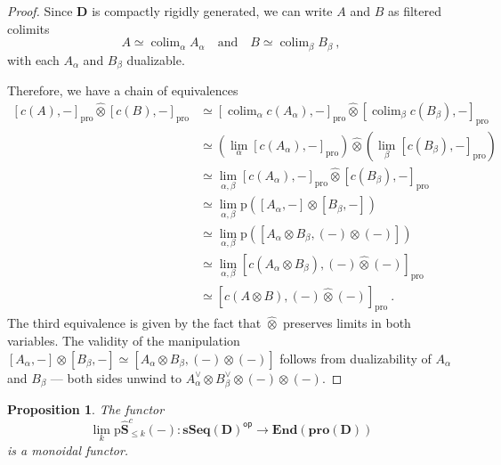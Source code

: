 \documentclass{proc-l}
\DeclareMathOperator*{\colim}{colim}
\theoremstyle{plain}
\newtheorem{proposition}[{theorem}]{Proposition}
\theoremstyle{definition}
\theoremstyle{remark}
\begin{document}
\begin{proof}
Since $\mathbf{D}$ is compactly rigidly generated, we can write $A$ and $B$ as filtered colimits
\[
A \simeq \colim_{\alpha} A_\alpha \quad \text{and} \quad B \simeq \colim_{\beta} B_\beta~,
\]
with each $A_\alpha$ and $B_\beta$ dualizable.

Therefore, we have a chain of equivalences
\begin{align*}
\left[c(A),-\right]_{\mathrm{pro}} \widehat{\otimes} \left[c(B),-\right]_{\mathrm{pro}} &\simeq \left[\colim_{\alpha} c(A_\alpha),-\right]_{\mathrm{pro}} \widehat{\otimes} \left[\colim_{\beta} c(B_\beta),-\right]_{\mathrm{pro}} \\
&\simeq \left(\lim_{\alpha} \left[c(A_\alpha),-\right]_{\mathrm{pro}}\right) \widehat{\otimes} \left( \lim_{\beta}\left[c(B_\beta),-\right]_{\mathrm{pro}}\right) \\
&\simeq \lim_{\alpha,\beta} \left[c(A_\alpha),-\right]_{\mathrm{pro}} \widehat{\otimes} \left[ c(B_\beta),-\right]_{\mathrm{pro}} \\
&\simeq \lim_{\alpha,\beta} \mathrm{p}\left(\left[A_\alpha,-\right] \otimes \left[ B_\beta,-\right]\right)\\
&\simeq \lim_{\alpha,\beta} \mathrm{p}\left(\left[A_\alpha \otimes B_\beta, (-) \otimes (-) \right]\right) \\
&\simeq \lim_{\alpha,\beta} \left[c(A_\alpha \otimes B_\beta), (-) \widehat\otimes (-) \right]_{\mathrm{pro}} \\
&\simeq \left[c(A \otimes B),(-) \widehat\otimes (-)\right]_{\mathrm{pro}}~.
\end{align*}
The third equivalence is given by the fact that $\widehat{\otimes}$ preserves limits in both variables. The validity of the manipulation $[A_\alpha,-]\otimes [B_\beta,-] \simeq [A_\alpha \otimes B_\beta,(-) \otimes (-) ]$ follows from dualizability of $A_\alpha$ and $B_\beta$ --- both sides unwind to $A_\alpha^\vee \otimes B_\beta^\vee \otimes (-) \otimes (-) $.
\end{proof}

\begin{proposition}%
\label{Proposition:3.10}The functor
\[
\lim_k \mathrm{p}\widehat{\mathbf{S}}^c_{\leq k}(-): \mathbf{sSeq}(\mathbf{D})^{\mathsf{op}} \longrightarrow \mathbf{End}(\mathbf{pro}(\mathbf{D}))
\]
is a monoidal functor.
\end{proposition}
\end{document}
